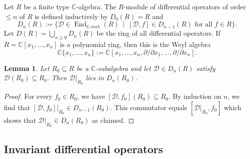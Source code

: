 \documentclass[reqno, 11pt]{amsart} %
\numberwithin{equation}{section}
\theoremstyle{plain}
\newtheorem{lemma}[theorem]{Lemma}
\theoremstyle{definition}
\theoremstyle{remark}
\newcommand{\mbC}{\mathbb{C}}
\newcommand{\mcD}{\mathcal{D}}
\DeclareMathOperator{\End}{End}
\begin{document}
Let $R$ be a finite type $\mbC$-algebra. The $R$-module of differential operators of order $\leq n$ of $R$ is defined inductively by $D_0(R) = R$ and
$$D_n(R) := \{\mcD\in \End_\text{$\mbC$-vect}(R)\ \mid\ [\mcD, f]\in D_{n-1}(R)\text{ for all $f\in R$}\}.$$
Let $D(R) = \bigcup_{n\geq 0} D_n(R)$ be the ring of all differential operators. If $R = \mbC[x_1,\ldots,x_n]$ is a polynomial ring, then this is the Weyl algebra
\begin{equation}\label{eq:notation_Weyl}
\mbC\{x_1,\ldots,x_n\} := \mbC[x_1,\ldots,x_n, \partial/\partial x_1,\ldots, \partial/\partial x_n].
\end{equation}
\begin{lemma}\label{lem:restrict_diff_op}
Let $R_0\subseteq R$ be a $\mbC$-subalgebra and let $\mcD\in D_n(R)$ satisfy $\mcD(R_0)\subseteq R_0$. Then $\mcD\vert_{R_0}$ lies in $D_n(R_0)$.
\end{lemma}
\begin{proof}
For every $f_0\in R_0$, we have $[\mcD,f_0](R_0)\subseteq R_0$. By induction on $n$, we find that $[\mcD,f_0]\vert_{R_0} \in D_{n-1}(R_0)$. This commutator equals $[\mcD\vert_{R_0}, f_0]$ which shows that $\mcD\vert_{R_0}\in D_n(R_0)$ as claimed.
\end{proof}

\subsection{Invariant differential operators}
\end{document}
